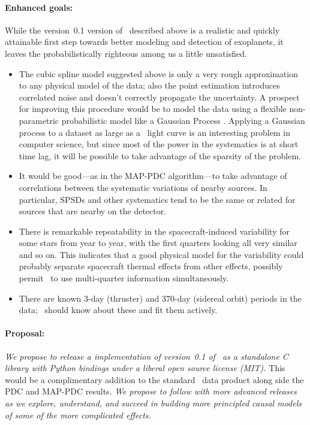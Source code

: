 \documentclass[letterpaper,12pt,preprint]{hack_aastex}
\newcommand{\Untrendy}{\package{Untrendy}}
\begin{document}
\paragraph{Enhanced goals:}
While the version~0.1 version of \Untrendy\ described above is a realistic and
quickly attainable first step towards better modeling and detection of
exoplanets, it leaves the probabilistically
righteous among us a little unsatisfied.
\begin{itemize}
\item
The cubic spline model suggested above is only a very rough approximation to
any physical model of the data; also the point estimation introduces
correlated noise and doesn't
correctly propagate the uncertainty.
A prospect for improving this procedure would be to model the data
using a flexible non-parametric probabilistic model like a Gaussian Process
 \citep{gp}.
Applying a Gaussian process to a dataset as large as a \Kepler\ light curve is
an interesting problem in computer science, but since most of the power in the
systematics is at short time lag, it will be possible to take advantage of
the sparsity of the problem.
\item
It would be good---as in the MAP-PDC
algorithm---to take advantage of correlations between the systematic
variations of nearby sources.
In particular, SPSDs and other
systematics tend to be the same or related for sources that are nearby
on the detector.
\item
There is remarkable repeatability in the spacecraft-induced
variability for some stars from year to year, with the
first quarters looking all very similar and so on.
This indicates that a good physical model for the variability could probably
separate spacecraft thermal effects from other effects, possibly
permit \Untrendy\ to use multi-quarter information simultaneously.
\item
There are known 3-day (thruster) and 370-day (sidereal orbit) periods
in the data; \Untrendy\ should know about these and fit them actively.
\end{itemize}

\paragraph{Proposal:}
\emph{We propose to release a implementation of version~0.1 of \Untrendy\ as a standalone C
library with Python bindings under a liberal open source license (MIT).}
This would be a complimentary addition to the standard \Kepler\ data
product along side the PDC and MAP-PDC results.
\emph{We propose to follow with more advanced releases as we explore,
understand, and succeed in building more principled causal models of some
of the more complicated effects.}
\end{document}
